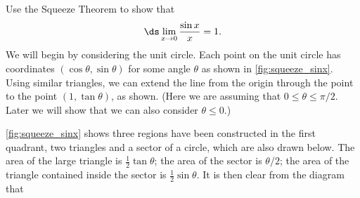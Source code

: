 \begin{example}\label{ex_limit_sinx_prove}
Use the Squeeze Theorem to show that
\[\ds \lim_{x\to 0} \frac{\sin x}{x} = 1.\]
\solution
We will begin by considering the unit circle. Each point on the unit circle has coordinates $(\cos \theta,\sin \theta)$ for some angle $\theta$ as shown in \autoref{fig:squeeze_sinx}. Using similar triangles, we can extend the line from the origin through the point to the point $(1,\tan \theta)$, as shown. (Here we are assuming that $0\leq \theta \leq \pi/2$. Later we will show that we can also consider $\theta \leq 0$.)


\autoref{fig:squeeze_sinx} shows three regions have been constructed in the first quadrant, two triangles and a sector of a circle, which are also drawn below. The area of the large triangle is $\frac12\tan\theta$; the area of the sector is $\theta/2$; the area of the triangle contained inside the sector is $\frac12\sin\theta$. It is then clear from the diagram that 


\end{example}
